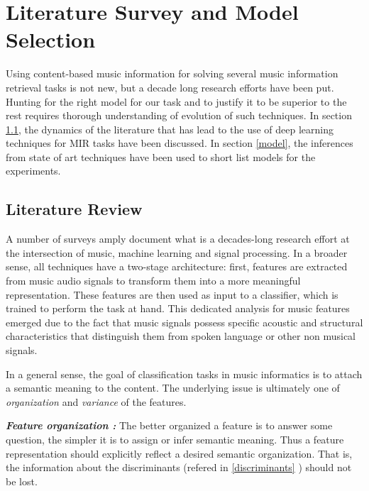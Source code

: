 

\chapter{Literature Survey and Model Selection } %

\label{Chapter3} %

Using content-based music information for solving several music information retrieval tasks is not new, but a decade long research efforts have been put. Hunting for the right model for our task and to justify it to be superior to the rest requires thorough understanding of evolution of such techniques. In section \ref{literature}, the dynamics of the literature that has lead to the use of deep learning techniques for MIR tasks have been discussed. In section \ref{model}, the inferences from state of art techniques have been used to short list models for the experiments.       


\section{Literature Review}
\label{literature}
A number of surveys\cite{survey1}\cite{survey2} amply document what is a decades-long research effort at the intersection of music, machine learning and signal processing. In a broader sense, all techniques have a two-stage architecture: first, features are extracted from music audio signals to transform them into a more meaningful representation. These features are then used as input to a classifier, which is trained to perform the task at hand. This dedicated analysis for music features emerged due to the fact that music signals possess specific acoustic and structural characteristics that distinguish them from spoken language or other non musical signals.
\bigskip

\noindent In a general sense, the goal of classification tasks in music informatics is to attach a semantic meaning to the content. The underlying issue is ultimately one of \textit{organization} and \textit{variance} of the features. 
\bigskip

\noindent \textit{\textbf{Feature organization :}} The better organized a feature is to answer some question, the simpler it is to assign or infer semantic meaning. Thus a feature representation should explicitly reflect a desired semantic organization. That is, the information about the discriminants (refered in \ref{discriminants} ) should not be lost.


